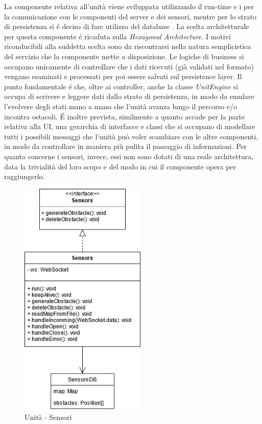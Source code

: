 La componente relativa all'unità viene sviluppata utilizzando il run-time  e i  per la comunicazione con le componenti del server e dei sensori, mentre per lo strato di persistenza si é deciso di fare utilizzo del database .
La scelta architetturale per questa componente é ricaduta sulla \textit{Hexagonal Architecture}.
I motivi riconducibili alla suddetta scelta sono da riscontrarsi nella natura semplicistica del servizio che la componente mette a disposizione. Le logiche di business si occupano unicamente di controllare che i dati ricevuti (già validati nel formato) vengano esaminati e processati per poi essere salvati sul persistence layer.
Il punto fondamentale é che, oltre ai controller, anche la classe \textit{UnitEngine} si occupa di scrivere e leggere dati dallo strato di persistenza, in modo da emulare l'evolvere degli stati mano a mano che l'unità avanza lungo il percorso e/o incontra ostacoli.
É inoltre prevista, similmente a quanto accade per la parte relativa alla UI, una gerarchia di interfacce e classi che si occupano di modellare tutti i possibili messaggi che l'unità può voler scambiare con le altre componenti, in modo da controllare in maniera più pulita il passaggio di informazioni.
Per quanto concerne i sensori, invece, essi non sono dotati di una reale architettura, data la trivialità del loro scopo e del modo in cui il componente opera per raggiungerlo.

\begin{figure}[H]
	\centering
	\includegraphics[width=6cm]{img/unit_sensori.png}
	\caption{Unità - Sensori}
\end{figure}

